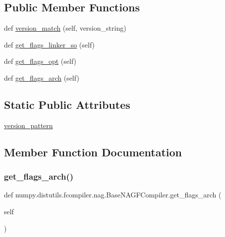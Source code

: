 \subsection*{Public Member Functions}
\begin{DoxyCompactItemize}
\item 
def \hyperlink{classnumpy_1_1distutils_1_1fcompiler_1_1nag_1_1BaseNAGFCompiler_aec32ed86354608e9e023d76fb18331c5}{version\+\_\+match} (self, version\+\_\+string)
\item 
def \hyperlink{classnumpy_1_1distutils_1_1fcompiler_1_1nag_1_1BaseNAGFCompiler_a37f9921a5c1b793528951b99baf94547}{get\+\_\+flags\+\_\+linker\+\_\+so} (self)
\item 
def \hyperlink{classnumpy_1_1distutils_1_1fcompiler_1_1nag_1_1BaseNAGFCompiler_a5680c52669d4d2a005c10cf824731f67}{get\+\_\+flags\+\_\+opt} (self)
\item 
def \hyperlink{classnumpy_1_1distutils_1_1fcompiler_1_1nag_1_1BaseNAGFCompiler_acf8a1996bf963be4853597aec83ebfbe}{get\+\_\+flags\+\_\+arch} (self)
\end{DoxyCompactItemize}
\subsection*{Static Public Attributes}
\begin{DoxyCompactItemize}
\item 
\hyperlink{classnumpy_1_1distutils_1_1fcompiler_1_1nag_1_1BaseNAGFCompiler_a3a614241af5ff588e2d5760c29922288}{version\+\_\+pattern}
\end{DoxyCompactItemize}


\subsection{Member Function Documentation}
\mbox{\label{classnumpy_1_1distutils_1_1fcompiler_1_1nag_1_1BaseNAGFCompiler_acf8a1996bf963be4853597aec83ebfbe}} 
\subsubsection{\texorpdfstring{get\+\_\+flags\+\_\+arch()}{get\_flags\_arch()}}
{\footnotesize\ttfamily def numpy.\+distutils.\+fcompiler.\+nag.\+Base\+N\+A\+G\+F\+Compiler.\+get\+\_\+flags\+\_\+arch (\begin{DoxyParamCaption}\item[{}]{self }\end{DoxyParamCaption})}

